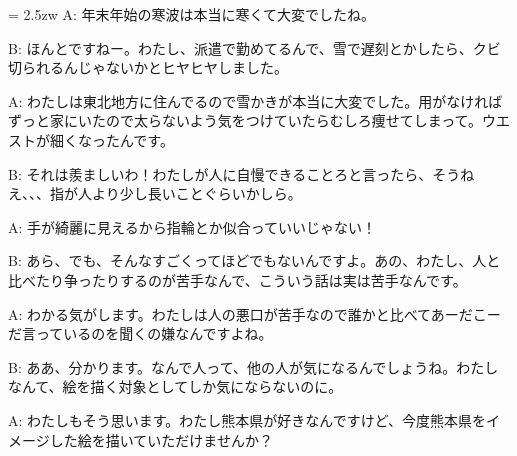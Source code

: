 \documentclass[11pt]{amsart}
\title{}
\author{}
\newenvironment{hangall}[1]{\hangindent = 2.5zw\everypar{\hangindent = 2.5zw}}{}
\begin{document}
\maketitle
\begin{hangall}{}%
A: 年末年始の寒波は本当に寒くて大変でしたね。



B: ほんとですねー。わたし、派遣で勤めてるんで、雪で遅刻とかしたら、クビ切られるんじゃないかとヒヤヒヤしました。



A: わたしは東北地方に住んでるので雪かきが本当に大変でした。用がなければずっと家にいたので太らないよう気をつけていたらむしろ痩せてしまって。ウエストが細くなったんです。



B: それは羨ましいわ！わたしが人に自慢できることろと言ったら、そうねえ、、、指が人より少し長いことぐらいかしら。



A: 手が綺麗に見えるから指輪とか似合っていいじゃない！



B: あら、でも、そんなすごくってほどでもないんですよ。あの、わたし、人と比べたり争ったりするのが苦手なんで、こういう話は実は苦手なんです。



A: わかる気がします。わたしは人の悪口が苦手なので誰かと比べてあーだこーだ言っているのを聞くの嫌なんですよね。



B: ああ、分かります。なんで人って、他の人が気になるんでしょうね。わたしなんて、絵を描く対象としてしか気にならないのに。



A: わたしもそう思います。わたし熊本県が好きなんですけど、今度熊本県をイメージした絵を描いていただけませんか？\end{hangall}
\end{document}
